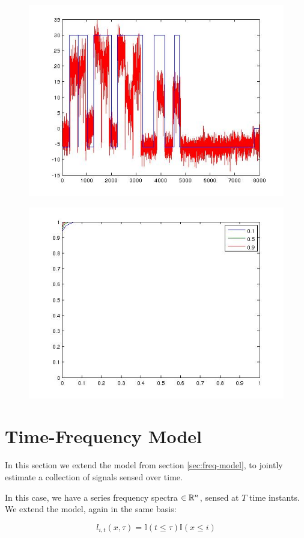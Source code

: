 \documentclass{article}
\begin{document}
\begin{figure}[h]
\centering
\includegraphics[height = 7.3 cm]{higher_noise_floor0.jpg}
\caption{}
\label{fig:hvb}
\end{figure}

\begin{figure}[h]
\centering
\includegraphics[height = 7.3 cm]{many_roc.jpg}
\caption{}
\label{fig:hvb}
\end{figure}

\section{Time-Frequency Model}
In this section we extend the model from section \ref{sec:freq-model}, to jointly estimate a collection of signals sensed over time. 

In this case, we have a series frequency spectra \(\in {\mathbb{R}}^n\), sensed at \(T\) time instants. We extend the model, again in the same basis:


\begin{equation}
l_{i,t}\left(x, \tau\right) = \mathbb{I}\left(t \leq \tau \right)\mathbb{I}\left(x \leq i\right)
\label{time-freq basis}
\end{equation}
\end{document}
